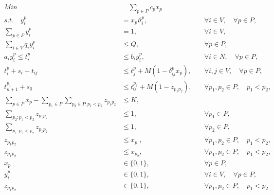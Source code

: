 \documentclass[11pt]{article}
\begin{document}
\begin{spreadlines}{14pt} %
\allowdisplaybreaks
\begin{align} 
Min &\quad \sum_{p \in P} c_p x_p &\quad
\label{eq1} \\
    s.t. \quad y^p_i &= x_p \vartheta^p_i, &\quad \forall i \in V, \quad \forall p \in P,
\label{eq2} \\
    \sum_{p \in P} y^p_i &= 1, &\quad \forall i \in V,
\label{eq3} \\
    \sum_{i \in V} q_i y^p_i &\leq Q, &\quad \forall p \in P,
\label{eq4} \\
    a_i y^p_i \leq t^p_i &\leq b_i y^p_i, &\quad \forall i \in N, \quad \forall p \in P,
\label{eq5} \\
    t^p_i + s_i + t_{ij} &\leq t^p_j + M(1 - \delta^p_{ij} x_p), &\quad \forall i, j \in V, \quad \forall p \in P,
\label{eq6} \\
    t^{p_1}_{n + 1} + s_0 &\leq t^{p_2}_0 + M(1 - z_{{p_1}{p_2}}), &\quad \forall p_1, p_2 \in P, \quad p_1 < p_2,
\label{eq7} \\
    \sum_{p \in P} x_p - \sum_{p_1 \in P} \sum_{p_2 \in P : p_1 < p_2} z_{{p_1}{p_2}} &\leq K,
\label{eq8} \\
    \sum_{p_2 : p_1 < p_2} z_{{p_1}{p_2}} &\leq 1, &\quad \forall p_1 \in P,
\label{eq9} \\
    \sum_{p_1 : p_1 < p_2} z_{{p_1}{p_2}} &\leq 1, &\quad \forall p_2 \in P,
\label{eq10} \\
    z_{{p_1}{p_2}} &\leq x_{p_1}, &\quad \forall p_1, p_2 \in P, \quad p_1 < p_2,
\label{eq11} \\
    z_{{p_1}{p_2}} &\leq x_{p_2}, &\quad \forall p_1, p_2 \in P, \quad p_1 < p_2,
\label{eq12} \\
    x_p &\in \{0,1\}, &\quad \forall p \in P,
\label{eq13} \\
    y^p_i &\in \{0,1\}, &\quad \forall i \in V, \quad \forall p \in P,
\label{eq14} \\
    z_{{p_1}{p_2}} &\in \{0,1\}, &\quad \forall p_1, p_2 \in P,  \quad p_1 < p_2
\label{eq15}
\end{align}
\end{spreadlines}

\end{document}
